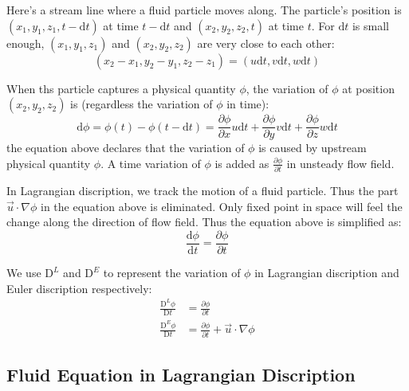Here's a stream line where a fluid particle moves along. 
The particle's position is $(x_1,y_1,z_1,t-\mathrm{d}t)$ at time $t-\mathrm{d}t$ and $(x_2,y_2,z_2,t)$ at time $t$. 
For $\mathrm{d} t$ is small enough, 
$(x_1,y_1,z_1)$ and $(x_2,y_2,z_2)$ are very close to each other:
\begin{equation}
    (x_2-x_1, y_2-y_1, z_2-z_1) = (u\mathrm{d}t, v\mathrm{d}t, w\mathrm{d}t)
\end{equation}

When ths particle captures a physical quantity $\phi$, 
the variation of $\phi$ at position $(x_2,y_2,z_2)$ is (regardless the variation of $\phi$ in time):
\begin{equation}
    \mathrm{d}\phi = \phi(t) - \phi(t-\mathrm{d}t) = \frac{\partial \phi}{\partial x} u \mathrm{d}t + \frac{\partial \phi}{\partial y} v \mathrm{d}t + \frac{\partial \phi}{\partial z} w \mathrm{d}t
\end{equation}
the equation above declares that the variation of $\phi$ is caused by 
upstream physical quantity $\phi$. 
A time variation of $\phi$ is added as $\frac{\partial \phi}{\partial t}$ in unsteady flow field.

In Lagrangian discription, 
we track the motion of a fluid particle. 
Thus the part $\vec{u}\cdot\nabla\phi$ in the equation above is eliminated. 
Only fixed point in space will feel the change along the direction of flow field.
Thus the equation above is simplified as:
\begin{equation}
    \frac{\mathrm{d} \phi}{\mathrm{d} t} = \frac{\partial \phi}{\partial t}
\end{equation}

We use $\mathrm{D}^L$ and $\mathrm{D}^E$ to represent the variation of $\phi$ in Lagrangian discription and Euler discription respectively:
\begin{equation}
    \begin{aligned}
        \frac{\mathrm{D}^L \phi}{\mathrm{D} t} &= \frac{\partial \phi}{\partial t}\\
        \frac{\mathrm{D}^E \phi}{\mathrm{D} t} &= \frac{\partial \phi}{\partial t} + \vec{u}\cdot\nabla\phi
    \end{aligned}
\end{equation}

\subsection{Fluid Equation in Lagrangian Discription}

